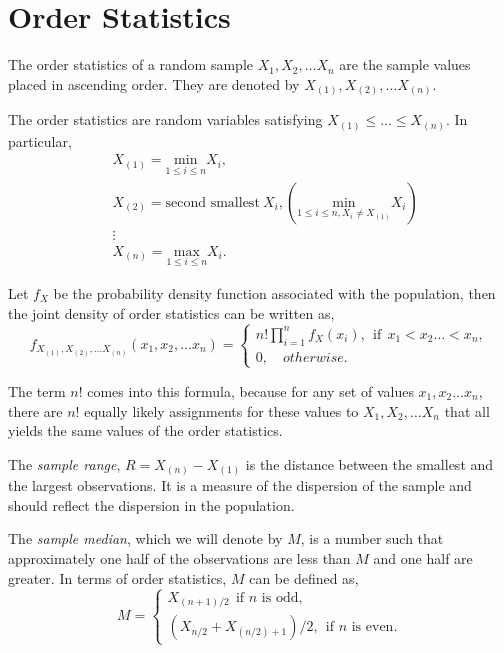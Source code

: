 \documentclass[a4paper,english,12pt]{article}
\begin{document}
\section{Order Statistics}
\begin{defn}
The order statistics of a random sample $X_1,X_2, \dots X_n$ are the sample values placed in ascending order. They are denoted by $X_{(1)},X_{(2)},\dots X_{(n)}$.
\end{defn}
The order statistics are random variables satisfying $X_{(1)}\leq\dots\leq X_{(n)}$. In particular,
\begin{align}
& X_{(1)}=\underset{1\leq i\leq n}{\text{min}} X_i ,\nonumber \\ 
& X_{(2)}=\mbox{second smallest}~X_i, \left(\underset{1\leq i\leq n,X_i\neq X_{(1)}}{\text{min}} X_i\right)\\ \nonumber
& \vdots \\ \nonumber
& X_{(n)}=\underset{1\leq i\leq n}{\text{max}} X_i.
\end{align}
\begin{thm}
Let $f_X$ be the probability density function associated with the population, then the joint density of order statistics can be written as,
\begin{equation}
f_{X_{(1)},X_{(2)},\dots X_{(n)}}(x_1,x_2, \ldots x_n)= 
		\begin{cases}
		n!\prod\limits_{i=1}^n f_X (x_i),~~\mbox{if}~~x_1<x_2 \ldots <x_n,\\
		0,\quad otherwise.
		\end{cases}
\end{equation}
\end{thm}
\begin{rem}
The term $n!$ comes into this formula, because for any set of values $x_1,x_2\ldots x_n$, there are $n!$ equally likely assignments for these values to $X_1,X_2, \dots X_n$ that all yields the same values of the order statistics.
\end{rem}
\begin{defn}
The \textit{sample range}, $R=X_{(n)}-X_{(1)}$ is the distance between the smallest and the largest observations. It is a measure of the dispersion of the sample and should reflect the dispersion in the population.
\end{defn}
\begin{defn}
The \textit{sample median}, which we will denote by $M$, is a number such that approximately one half of the observations are less than $M$ and one half are greater. In terms of order statistics, $M$ can be defined as,
\begin{equation}
M= 
		\begin{cases}
	 X_{(n+1)/2}~~\mbox{if~$n$~is~odd},\\
	(X_{n/2}+X_{(n/2)+1})/2,~~\mbox{if~$n$~is~even}.
		\end{cases}
\end{equation}
\end{defn}
\end{document}

